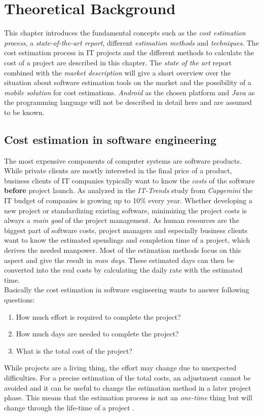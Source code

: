 \chapter{Theoretical Background}

This chapter introduces the fundamental concepts such as the \textit{cost estimation process}, a \textit{state-of-the-art report}, different \textit{estimation methods} and \textit{techniques}. The cost estimation process in IT projects and the different methods to calculate the cost of a project are described in this chapter. The \textit{state of the art} report combined with the \textit{market description} will give a short overview over the situation about software estimation tools on the market and the possibility of a \textit{mobile solution} for cost estimations. \textit{Android} as the chosen platform and \textit{Java} as the programming language will not be described in detail here and are assumed to be known.

\section{Cost estimation in software engineering}

The most expensive components of computer systems are software products. While private clients are mostly interested in the final price of a product, business clients of IT companies typically want to know the \textit{costs} of the software \textbf{before} project launch. As analyzed in the \textit{IT-Trends} study from \textit{Capgemini} \cite{capgemini} the IT budget of companies is growing up to 10\% every year. Whether developing a new project or standardizing existing software, minimizing the project costs is always a \textit{main goal} of the project management. As human resources are the biggest part of software costs, project managers and especially business clients want to know the estimated spendings and completion time of a project, which derives the needed manpower. Most of the estimation methods focus on this aspect and give the result in \textit{man days}. These estimated days can then be converted into the real costs by calculating the daily rate with the estimated time.
\\
Basically the cost estimation in software engineering wants to answer following questions:
\begin{enumerate}
\item How much effort is required to complete the project?
\item How much days are needed to complete the project?
\item What is the total cost of the project?
\end{enumerate}
While projects are a living thing, the effort may change due to unexpected difficulties. For a precise estimation of the total costs, an adjustment cannot be avoided and it can be useful to change the estimation method in a later project phase. This means that the estimation process is not an \textit{one-time} thing but will change through the life-time of a project \cite{itplanung}. 


